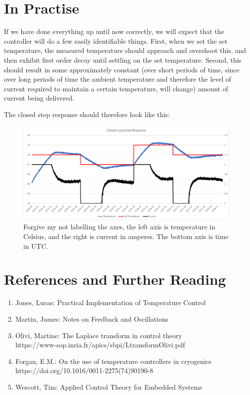 \documentclass[11pt, letterpaper]{article}
\begin{document}
\section{In Practise}
If we have done everything up until now correctly, we will expect that the controller will do a few easily identifiable things. First, when we set the set temperature, the measured temperature should approach and overshoot this, and then exhibit first order decay until settling on the set temperature. Second, this should result in some approximately constant (over short periods of time, since over long periods of time the ambient temperature and therefore the level of current required to maintain a certain temperature, will change) amount of current being delivered.

The closed step response should therefore look like this:

\begin{figure}[H]
    \centering
    \includegraphics[width=16cm]{closedLoopStep.png}
    \caption{ Forgive my not labelling the axes, the left axis is temperature in Celsius, and the right is current in amperes. The bottom axis is time in UTC. }
    \label{fig:closedLoopStep}
\end{figure}

\newpage
\section{References and Further Reading}
\begin{enumerate}
    \item Jones, Lucas: Practical Implementation of Temperature Control
    \item Martin, James: Notes on Feedback and Oscillations
    \item Olivi, Martine: The Laplace transform in control theory \\ https://www-sop.inria.fr/apics/sbpi/LtransformOlivi.pdf
    \item Forgan, E.M.: On the use of temperature controllers in cryogenics \\ https://doi.org/10.1016/0011-2275(74)90190-8
    \item Wescott, Tim: Applied Control Theory for Embedded Systems
\end{enumerate}
\end{document}
